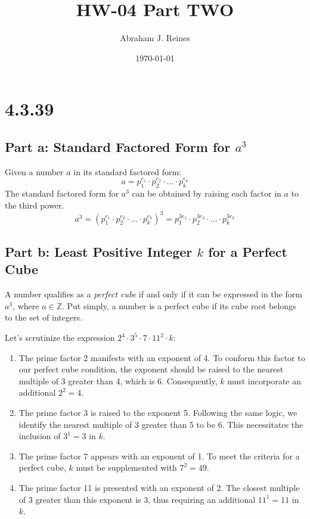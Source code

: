 \documentclass[12pt]{article}
\begin{document}
\doublespacing %

\title{HW-04 Part TWO}
\author{Abraham J. Reines}
\date{\today}
\maketitle

\section{4.3.39}

\subsection{Part a: Standard Factored Form for \( a^3 \)}
Given a number \( a \) in its standard factored form:
\[
a = p_1^{e_1} \cdot p_2^{e_2} \cdot \ldots \cdot p_k^{e_k}
\]
The standard factored form for \( a^3 \) can be obtained by raising each factor in \( a \) to the third power.
\[
a^3 = (p_1^{e_1} \cdot p_2^{e_2} \cdot \ldots \cdot p_k^{e_k})^3 = p_1^{3e_1} \cdot p_2^{3e_2} \cdot \ldots \cdot p_k^{3e_k}
\]

\subsection{Part b: Least Positive Integer \( k \) for a Perfect Cube}
A number qualifies as a \textit{perfect cube} if and only if it can be expressed in the form \(a^3\), where \(a \in \mathbb{Z}\). Put simply, a number is a perfect cube if its cube root belongs to the set of integers.

\newpage

Let's scrutinize the expression \(2^4 \cdot 3^5 \cdot 7 \cdot 11^2 \cdot k\):

\begin{enumerate}[itemsep=3em, topsep=3em, partopsep=3em]
    \item The prime factor 2 manifests with an exponent of 4. To conform this factor to our perfect cube condition, the exponent should be raised to the nearest multiple of 3 greater than 4, which is 6. Consequently, \(k\) must incorporate an additional \(2^2 = 4\).
    \item The prime factor 3 is raised to the exponent 5. Following the same logic, we identify the nearest multiple of 3 greater than 5 to be 6. This necessitates the inclusion of \(3^1 = 3\) in \(k\).
    \item The prime factor 7 appears with an exponent of 1. To meet the criteria for a perfect cube, \(k\) must be supplemented with \(7^2 = 49\).
    \item The prime factor 11 is presented with an exponent of 2. The closest multiple of 3 greater than this exponent is 3, thus requiring an additional \(11^1 = 11\) in \(k\).
\end{enumerate}
\end{document}
